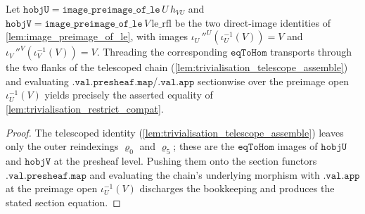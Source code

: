 \begin{lemma}\leanok
  \label{lem:trivialisation_restrict_sectionwise}
  Let \(\mathtt{hobjU} = \mathtt{image\_preimage\_of\_le}\,U\,h_{VU}\) and
  \(\mathtt{hobjV} = \mathtt{image\_preimage\_of\_le}\,V\,\mathrm{le\_rfl}\) be the two direct-image
  identities of \cref{lem:image_preimage_of_le}, with images \(\iota_U\,''^U(\iota_U^{-1}(V)) = V\) and
  \(\iota_V\,''^V(\iota_V^{-1}(V)) = V\). Threading the corresponding \(\mathtt{eqToHom}\) transports
  through the two flanks of the telescoped chain (\cref{lem:trivialisation_telescope_assemble}) and
  evaluating \(\mathtt{.val.presheaf.map}\)/\(\mathtt{.val.app}\) sectionwise over the preimage open
  \(\iota_U^{-1}(V)\) yields precisely the asserted equality of
  \cref{lem:trivialisation_restrict_compat}.
\end{lemma}
\begin{proof}
  \leanok
  The telescoped identity (\cref{lem:trivialisation_telescope_assemble}) leaves only the outer
  reindexings \(\varrho_0\) and \(\varrho_5\); these are the \(\mathtt{eqToHom}\) images of
  \(\mathtt{hobjU}\) and \(\mathtt{hobjV}\) at the presheaf level. Pushing them onto the section
  functors \(\mathtt{.val.presheaf.map}\) and evaluating the chain's underlying morphism with
  \(\mathtt{.val.app}\) at the preimage open \(\iota_U^{-1}(V)\) discharges the bookkeeping and produces
  the stated section equation.
\end{proof}

